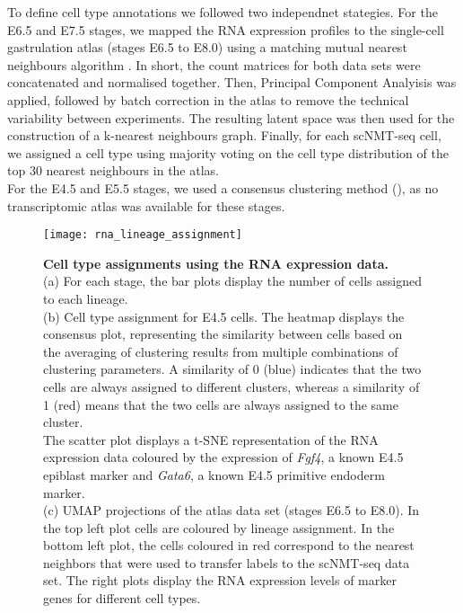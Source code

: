 To define cell type annotations we followed two independnet stategies. For the E6.5 and E7.5 stages, we mapped the RNA expression profiles to the single-cell gastrulation atlas \cite{Pijuan-Sala2019} (stages E6.5 to E8.0) using a matching mutual nearest neighbours algorithm \cite{Haghverdi2018}. In short, the count matrices for both data sets were concatenated and normalised together. Then, Principal Component Analyisis was applied, followed by batch correction in the atlas to remove the technical variability between experiments. The resulting latent space was then used for the construction of a k-nearest neighbours graph. Finally, for each scNMT-seq cell, we assigned a cell type using majority voting on the cell type distribution of the top 30 nearest neighbours in the atlas.\\
For the E4.5 and E5.5 stages, we used a consensus clustering method \cite{Kiselev2017} (), as no transcriptomic atlas was available for these stages.

\begin{figure}[H]
	\centering
	\texttt{[image: rna\_lineage\_assignment]}
	\caption[]{
	\textbf{Cell type assignments using the RNA expression data.} \\
	(a) For each stage, the bar plots display the number of cells assigned to each lineage.\\
	(b) Cell type assignment for E4.5 cells. The heatmap displays the consensus plot, representing the similarity between cells based on the averaging of clustering results from multiple combinations of clustering parameters\cite{Kiselev2017}. A similarity of 0 (blue) indicates that the two cells are always assigned to different clusters, whereas a similarity of 1 (red) means that the two cells are always assigned to the same cluster.\\
	The scatter plot displays a t-SNE representation of the RNA expression data coloured by the expression of \textit{Fgf4}, a known E4.5 epiblast marker and \textit{Gata6}, a known E4.5 primitive endoderm marker.\\
	(c) UMAP projections of the atlas data set (stages E6.5 to E8.0). In the top left plot cells are coloured by lineage assignment. In the bottom left plot, the cells coloured in red correspond to the nearest neighbors that were used to transfer labels to the scNMT-seq data set. The right plots display the RNA expression levels of marker genes for different cell types.
	}
	\label{fig:lineage_assignment}
\end{figure}

